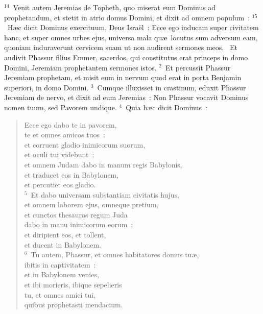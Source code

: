 ${}^{14}$~Venit autem Jeremias de Topheth, quo miserat eum Dominus ad prophetandum, et stetit in atrio domus Domini, et dixit ad omnem populum~:
${}^{15}$~H\ae c dicit Dominus exercituum, Deus Isra\"el~: Ecce ego inducam super civitatem hanc, et super omnes urbes ejus, universa mala qu\ae\ locutus sum adversum eam, quoniam induraverunt cervicem suam ut non audirent sermones meos.
~Et audivit Phassur filius Emmer, sacerdos, qui constitutus erat princeps in domo Domini, Jeremiam prophetantem sermones istos.
${}^{2}$~Et percussit Phassur Jeremiam prophetam, et misit eum in nervum quod erat in porta Benjamin superiori, in domo Domini.
${}^{3}$~Cumque illuxisset in crastinum, eduxit Phassur Jeremiam de nervo, et dixit ad eum Jeremias~: Non Phassur vocavit Dominus nomen tuum, sed Pavorem undique.
${}^{4}$~Quia h\ae c dicit Dominus~: \begin{flushleft}\begin{verse}Ecce ego dabo te in pavorem,\\ te et omnes amicos tuos~:\\ et corruent gladio inimicorum suorum,\\ et oculi tui videbunt~:\\ et omnem Judam dabo in manum regis Babylonis,\\ et traducet eos in Babylonem,\\ et percutiet eos gladio.\\
${}^{5}$~Et dabo universam substantiam civitatis hujus,\\ et omnem laborem ejus, omneque pretium,\\ et cunctos thesauros regum Juda\\ dabo in manu inimicorum eorum~:\\ et diripient eos, et tollent,\\ et ducent in Babylonem.\\
${}^{6}$~Tu autem, Phassur, et omnes habitatores domus tu\ae ,\\ ibitis in captivitatem~:\\ et in Babylonem venies,\\ et ibi morieris, ibique sepelieris\\ tu, et omnes amici tui,\\ quibus prophetasti mendacium.\end{verse}\end{flushleft}


